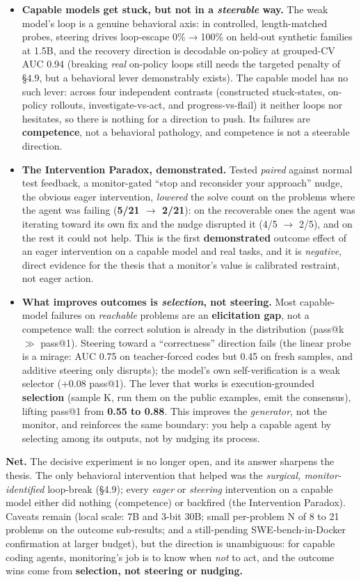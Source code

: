 \begin{itemize}
\item \textbf{Capable models get stuck, but not in a \emph{steerable} way.} The weak model's loop is a genuine behavioral axis: in controlled, length-matched probes, steering drives loop-escape 0\%$\to$100\% on held-out synthetic families at 1.5B, and the recovery direction is decodable on-policy at grouped-CV AUC 0.94 (breaking \emph{real} on-policy loops still needs the targeted penalty of \S4.9, but a behavioral lever demonstrably exists). The capable model has no such lever: across four independent contrasts (constructed stuck-states, on-policy rollouts, investigate-vs-act, and progress-vs-flail) it neither loops nor hesitates, so there is nothing for a direction to push. Its failures are \textbf{competence}, not a behavioral pathology, and competence is not a steerable direction.
\item \textbf{The Intervention Paradox, demonstrated.} Tested \emph{paired} against normal test feedback, a monitor-gated ``stop and reconsider your approach'' nudge, the obvious eager intervention, \emph{lowered} the solve count on the problems where the agent was failing (\textbf{5/21 $\to$ 2/21}): on the recoverable ones the agent was iterating toward its own fix and the nudge disrupted it (4/5 $\to$ 2/5), and on the rest it could not help. This is the first \textbf{demonstrated} outcome effect of an eager intervention on a capable model and real tasks, and it is \emph{negative}, direct evidence for the thesis that a monitor's value is calibrated restraint, not eager action.
\item \textbf{What improves outcomes is \emph{selection}, not steering.} Most capable-model failures on \emph{reachable} problems are an \textbf{elicitation gap}, not a competence wall: the correct solution is already in the distribution (pass@k $\gg$ pass@1). Steering toward a ``correctness'' direction fails (the linear probe is a mirage: AUC 0.75 on teacher-forced codes but 0.45 on fresh samples, and additive steering only disrupts); the model's own self-verification is a weak selector (+0.08 pass@1). The lever that works is execution-grounded \textbf{selection} (sample K, run them on the public examples, emit the consensus), lifting pass@1 from \textbf{0.55 to 0.88}. This improves the \emph{generator}, not the monitor, and reinforces the same boundary: you help a capable agent by selecting among its outputs, not by nudging its process.
\end{itemize}
\textbf{Net.} The decisive experiment is no longer open, and its answer sharpens the thesis. The only behavioral intervention that helped was the \emph{surgical, monitor-identified} loop-break (\S4.9); every \emph{eager} or \emph{steering} intervention on a capable model either did nothing (competence) or backfired (the Intervention Paradox). Caveats remain (local scale: 7B and 3-bit 30B; small per-problem N of 8 to 21 problems on the outcome sub-results; and a still-pending SWE-bench-in-Docker confirmation at larger budget), but the direction is unambiguous: for capable coding agents, monitoring's job is to know when \emph{not} to act, and the outcome wins come from \textbf{selection, not steering or nudging.}

